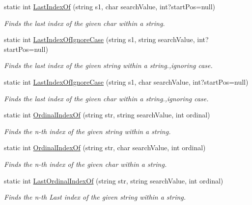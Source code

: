 \begin{DoxyCompactItemize}
static int \hyperlink{class_ultimate_1_1_utilities_1_1_string_utils_ae90fc8a9474590198d44b29b4b815302}{Last\+Index\+Of} (string s1, char search\+Value, int?start\+Pos=null)
\begin{DoxyCompactList}\small\item\em Finds the last index of the given char within a string. \end{DoxyCompactList}\item 
static int \hyperlink{class_ultimate_1_1_utilities_1_1_string_utils_a2b2bcf1949ce982e77d7c6bb72e57d04}{Last\+Index\+Of\+Ignore\+Case} (string s1, string search\+Value, int?start\+Pos=null)
\begin{DoxyCompactList}\small\item\em Finds the last index of the given string within a string.,ignoring case. \end{DoxyCompactList}\item 
static int \hyperlink{class_ultimate_1_1_utilities_1_1_string_utils_a6ac102148459619a911954d50dda1f40}{Last\+Index\+Of\+Ignore\+Case} (string s1, char search\+Value, int?start\+Pos=null)
\begin{DoxyCompactList}\small\item\em Finds the last index of the given char within a string.,ignoring case. \end{DoxyCompactList}\item 
static int \hyperlink{class_ultimate_1_1_utilities_1_1_string_utils_a3aad56a2ec1e3a1fd34f523e74b68698}{Ordinal\+Index\+Of} (string str, string search\+Value, int ordinal)
\begin{DoxyCompactList}\small\item\em Finds the n-\/th index of the given string within a string. \end{DoxyCompactList}\item 
static int \hyperlink{class_ultimate_1_1_utilities_1_1_string_utils_aac764ac04138fe34c9afdc9a86968a1e}{Ordinal\+Index\+Of} (string str, char search\+Value, int ordinal)
\begin{DoxyCompactList}\small\item\em Finds the n-\/th index of the given char within a string. \end{DoxyCompactList}\item 
static int \hyperlink{class_ultimate_1_1_utilities_1_1_string_utils_a550748a0cce9e34422739a56ff6b1f05}{Last\+Ordinal\+Index\+Of} (string str, string search\+Value, int ordinal)
\begin{DoxyCompactList}\small\item\em Finds the n-\/th Last index of the given string within a string. \end{DoxyCompactList}\item 

\end{DoxyCompactItemize}
